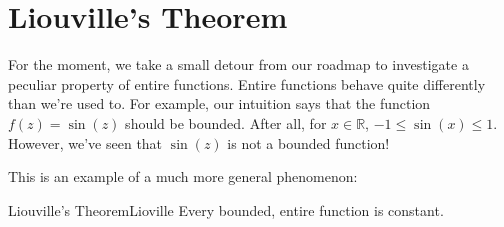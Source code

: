 \section{Liouville's Theorem}

For the moment, we take a small detour from our roadmap to investigate a peculiar property of entire functions. Entire functions behave quite differently than we're used to. For example, our intuition says that the function $f(z) = \sin(z)$ should be bounded. After all, for $x \in \mathbb{R}$, $-1 \le \sin(x) \le 1$. However, we've seen that $\sin(z)$ is not a bounded function!

This is an example of a much more general phenomenon:

\begin{thmbo}{Liouville's Theorem}{Lioville} Every bounded, entire function is constant.\end{thmbo}
